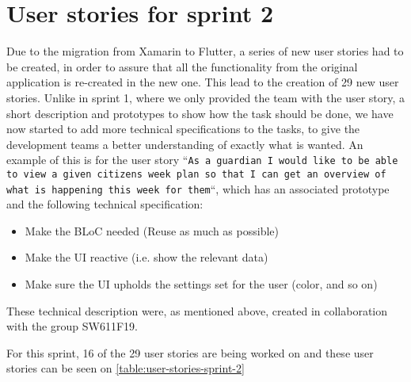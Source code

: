 \section{User stories for sprint 2}
Due to the migration from Xamarin to Flutter, a series of new user stories had to be created, in order to assure that all the functionality from the original application is re-created in the new one.
This lead to the creation of 29 new user stories.
Unlike in sprint 1, where we only provided the team with the user story, a short description and prototypes to show how the task should be done, we have now started to add more technical specifications to the tasks, to give the development teams a better understanding of exactly what is wanted.
An example of this is for the user story ``\texttt{As a guardian I would like to be able to view a given citizens week plan so that I can get an overview of what is happening this week for them}``, which has an associated prototype and the following technical specification:

\begin{itemize}
    \item Make the BLoC needed (Reuse as much as possible)
    \item Make the UI reactive (i.e. show the relevant data)
    \item Make sure the UI upholds the settings set for the user (color, and so on)
\end{itemize}
These technical description were, as mentioned above, created in collaboration with the group SW611F19.


\noindent For this sprint, 16 of the 29 user stories are being worked on and these user stories can be seen on \autoref{table:user-stories-sprint-2}


